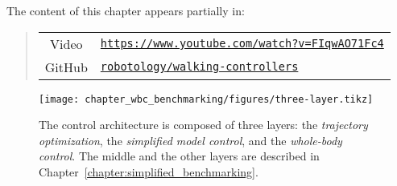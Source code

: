 The content of this chapter appears partially in:
\begin{leftbar}
	\begin{quote}%
		 \vspace{5mm}\newline 
		 \vspace{5mm} \newline
		\begin{tabular}{c p{10.0cm}}
			     Video & \href{https://www.youtube.com/watch?v=FIqwAO71Fc4}{\texttt{https://www.youtube.com/watch?v=FIqwAO71Fc4}} \\
			     GitHub &  \href{https://github.com/robotology/walking-controllers}{\texttt{robotology/walking-controllers}} 
		\end{tabular}
	\end{quote}
\end{leftbar}

\begin{figure}[t]
    \centering
    \texttt{[image: chapter\_wbc\_benchmarking/figures/three-layer.tikz]}
    \caption[The three layer controller architecture for bipedal locomotion in rigid environment]{The control architecture is composed of three layers: the \emph{trajectory optimization}, the \emph{simplified model control}, and the \emph{whole-body control}. The middle and the other layers are described in Chapter~\ref{chapter:simplified_benchmarking}.
    \label{fig:three-layer-wbc-benchmarking}}
\end{figure}





